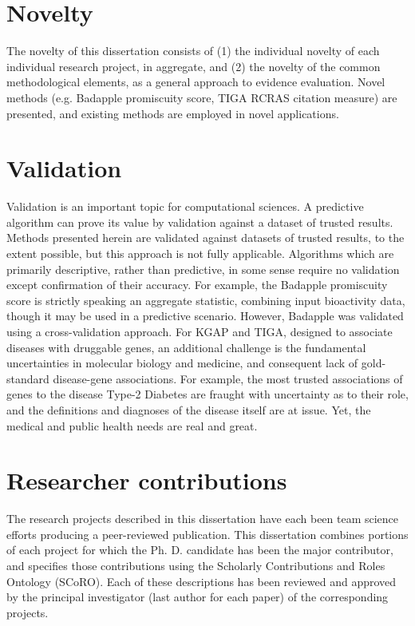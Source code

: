\section{Novelty}

The novelty of this dissertation consists of (1) the individual novelty of each individual research project, in aggregate, and (2) the novelty of the common methodological elements, as a general approach to evidence evaluation. Novel methods (e.g. Badapple promiscuity score, TIGA RCRAS citation measure) are presented, and existing methods are employed in novel applications.

\section{Validation}

Validation is an important topic for computational sciences. A predictive algorithm can prove its value by validation against a dataset of trusted results. Methods presented herein are validated against datasets of trusted results, to the extent possible, but this approach is not fully applicable. Algorithms which are primarily descriptive, rather than predictive, in some sense require no validation except confirmation of their accuracy. For example, the Badapple promiscuity score is strictly speaking an aggregate statistic, combining input bioactivity data, though it may be used in a predictive scenario. However, Badapple was validated using a cross-validation approach. For KGAP and TIGA, designed to associate diseases with druggable genes, an additional challenge is the fundamental uncertainties in molecular biology and medicine, and consequent lack of gold-standard disease-gene associations. For example, the most trusted associations of genes to the disease Type-2 Diabetes are fraught with uncertainty as to their role, and the definitions and diagnoses of the disease itself are at issue. Yet, the medical and public health needs are real and great. 

\section{Researcher contributions}

The research projects described in this dissertation have each been team science efforts producing a peer-reviewed publication. This dissertation combines portions of each project for which the Ph. D. candidate has been the major contributor, and specifies those contributions using the Scholarly Contributions and Roles Ontology (SCoRO)\cite{Shotton2020-ph}. Each of these descriptions has been reviewed and approved by the principal investigator (last author for each paper) of the corresponding projects. 